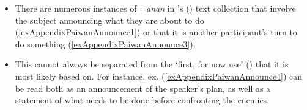 \begin{itemize}
	\sloppy
	\item There are numerous instances of \mbox{=\textit{anan}} in \citeauthor{EarlyWhitehorn2003}'s (\citeyear{EarlyWhitehorn2003}) text collection that involve the subject announcing what they are about to do (\ref{exAppendixPaiwanAnnounce1}) or that it is another participant's turn to do something (\ref{exAppendixPaiwanAnnounce3}).
	\item This cannot always be separated from the \lq first, for now use\rq{ } () that it is most likely based on. For instance, ex. (\ref{exAppendixPaiwanAnnounce4}) can be read both as an announcement of the speaker's plan, as well as a statement of what needs to be done before confronting the enemies.	
\end{itemize}

